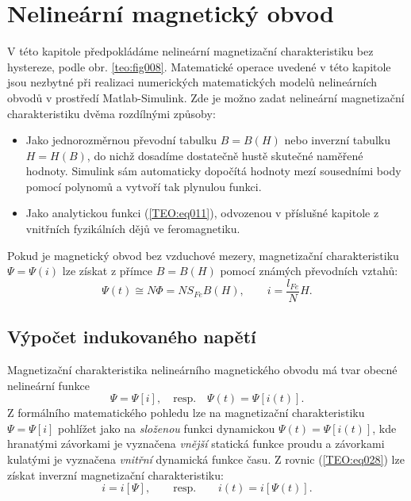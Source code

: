   \section{Nelineární magnetický obvod}
    V této kapitole předpokládáme nelineární magnetizační charakteristiku bez hystereze, podle obr. 
    \ref{teo:fig008}. Matematické operace uvedené v této kapitole jsou nezbytné při realizaci 
    numerických matematických modelů nelineárních obvodů v prostředí Matlab-Simulink. Zde je možno 
    zadat nelineární magnetizační charakteristiku dvěma rozdílnými způsoby:
    \begin{itemize}
      \item Jako jednorozměrnou převodní tabulku \(B = B(H)\) nebo inverzní tabulku \(H = H(B)\),
            do nichž dosadíme dostatečně hustě skutečné naměřené hodnoty. Simulink sám automaticky
            dopočítá hodnoty mezí sousedními body pomocí polynomů a vytvoří tak plynulou funkci.
      \item Jako analytickou funkci (\ref{TEO:eq011}), odvozenou v příslušné kapitole z vnitřních
            fyzikálních dějů ve feromagnetiku.
    \end{itemize}
    Pokud je magnetický obvod bez vzduchové mezery, magnetizační charakteristiku \(\Psi = \Psi(i)\) 
    lze získat z přímce \(B = B(H)\) pomocí známých převodních vztahů:
    \begin{equation}  \label{TEO:eq012}
      \Psi(t) \cong N\Phi = NS_{Fe}B(H), \qquad i = \dfrac{l_{Fe}}{N}H.
    \end{equation}
    
    \subsection{Výpočet indukovaného napětí}
      Magnetizační charakteristika nelineárního magnetického obvodu má tvar obecné nelineární 
      funkce 
      \begin{equation}\label{TEO:eq028}
        \Psi    = \Psi[i], \quad\text{resp.}\quad
        \Psi(t) = \Psi[i(t)].
      \end{equation}
      Z formálního matematického pohledu lze na magnetizační charakteristiku \(\Psi = \Psi[i]\) 
      pohlížet jako na \emph{složenou} funkci dynamickou \(\Psi(t) = \Psi[i(t)]\), kde hranatými 
      závorkami je vyznačena \emph{vnější} statická funkce proudu a závorkami kulatými je vyznačena 
      \emph{vnitřní} dynamická funkce času. Z rovnic (\ref{TEO:eq028}) lze získat inverzní 
      magnetizační charakteristiku:
      \begin{equation}\label{TEO:eq029}
        i = i[\Psi], \qquad\text{resp.}\qquad i(t) = i[\Psi(t)].
      \end{equation}

